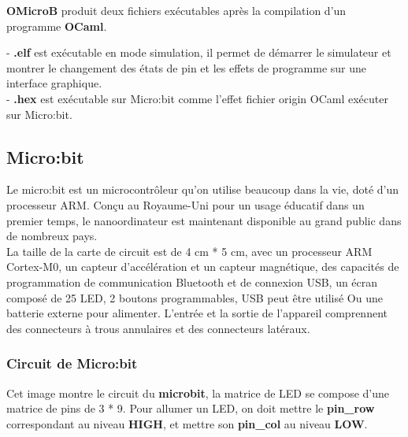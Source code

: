 \documentclass[14px]{article}
\begin{document}
\textbf{OMicroB} produit deux fichiers exécutables après la compilation d'un programme \textbf{OCaml}.

- \textbf{.elf} est exécutable en mode simulation, il permet de démarrer le simulateur et montrer le changement des états de pin et les effets de programme sur une interface graphique.\\
- \textbf{.hex} est exécutable sur Micro:bit comme l'effet fichier origin OCaml exécuter sur Micro:bit.

\subsection{Micro:bit}
Le micro:bit est un microcontrôleur qu'on utilise beaucoup dans la vie, doté d'un processeur ARM. Conçu au Royaume-Uni pour un usage éducatif dans un premier temps, le nanoordinateur est maintenant disponible au grand public dans de nombreux pays.\\

La taille de la carte de circuit est de 4 cm * 5 cm, avec un processeur ARM Cortex-M0, un capteur d'accélération et un capteur magnétique, des capacités de programmation de communication Bluetooth et de connexion USB, un écran composé de 25 LED, 2 boutons programmables, USB peut être utilisé Ou une batterie externe pour alimenter. L'entrée et la sortie de l'appareil comprennent des connecteurs à trous annulaires et des connecteurs latéraux.

\subsubsection{Circuit de Micro:bit}
Cet image montre le circuit du \textbf{microbit}, la matrice de LED se compose d'une matrice de pins de 3 * 9. Pour allumer un LED, on doit mettre le \textbf{pin\_row} correspondant au niveau \textbf{HIGH}, et mettre son \textbf{pin\_col} au niveau \textbf{LOW}.

\begin{figure}
\end{figure}
\end{document}

